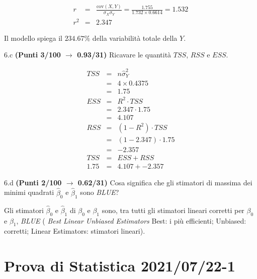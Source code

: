 \documentclass[
  11pt,
]{book}
\theoremstyle{mytheoremstyle}
\theoremstyle{mydefstyle}
\newenvironment{sol}
  {
  \begin{tcolorbox}[enhanced,breakable,arc=0.1mm,boxrule=1pt,colback=white,colframe=iblue,
  title=\bf \fontfamily{lmss}\selectfont \hspace{.5 cm} Soluzione,drop fuzzy shadow]

}{
\end{tcolorbox}
  }
\begin{document}
\begin{sol}
\begin{eqnarray*}
r&=&\frac{\text{cov}(X,Y)}{\sigma_X\sigma_Y}=\frac{ 1.755 }{ 1.732 \times 0.6614 }= 1.532 \\ 
r^2&=& 2.347\end{eqnarray*}

Il modello spiega il \(234.67\%\) della variabilità totale della \(Y\).

\end{sol}

6.c \textbf{(Punti 3/100 \(\rightarrow\) 0.93/31)} Ricavare le quantità \(TSS\), \(RSS\) e \(ESS\).

\begin{sol}
\begin{eqnarray*}
   TSS &=& n\hat\sigma^2_Y\\
      &=& 4 \times 0.4375 \\
      &=&  1.75 \\
   ESS &=& R^2\cdot TSS\\
      &=&  2.347 \cdot 1.75 \\
      &=& 4.107 \\
   RSS &=& (1-R^2)\cdot TSS\\
      &=& (1- 2.347 )\cdot 1.75 \\
      &=&  -2.357 \\
   TSS &=& ESS+RSS \\ 1.75  &=&  4.107 + -2.357 
  \end{eqnarray*}

\end{sol}

6.d \textbf{(Punti 2/100 \(\rightarrow\) 0.62/31)} Cosa significa che gli stimatori di massima dei minimi quadrati \(\hat\beta_0\) e \(\hat\beta_1\) sono \emph{BLUE}?

\begin{sol}
Gli stimatori \(\hat\beta_{0}\) e \(\hat\beta_{1}\) di \(\beta_{0}\) e \(\beta_{1}\)
sono, tra tutti gli stimatori lineari corretti per \(\beta_0\) e \(\beta_1\), \emph{BLUE}
( \emph{Best Linear Unbiased Estimators} Best: i più efficienti; Unbiased: corretti;
Linear Estimators: stimatori lineari).

\end{sol}

\section{Prova di Statistica 2021/07/22-1}\label{prova-di-statistica-20210722-1}
\end{document}
